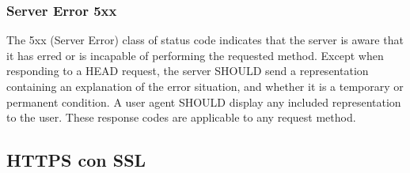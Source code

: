 \subsubsection{Server Error 5xx}

   The 5xx (Server Error) class of status code indicates that the server
   is aware that it has erred or is incapable of performing the
   requested method.  Except when responding to a HEAD request, the
   server SHOULD send a representation containing an explanation of the
   error situation, and whether it is a temporary or permanent   condition.  A user agent SHOULD display any included representation
   to the user.  These response codes are applicable to any request
   method.

  

\subsection{HTTPS con SSL} 